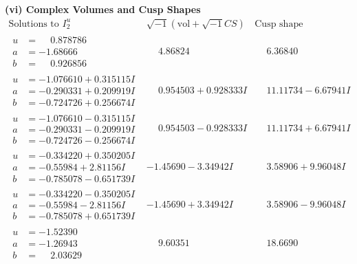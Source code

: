 \documentclass[1p]{elsarticle_modified}
\theoremstyle{definition}
\newcommand{\I}{\sqrt{-1}}
\begin{document}
\newpage\flushleft \textbf{(vi) Complex Volumes and Cusp Shapes}
$$\begin{array}{c|c|c}  
\text{Solutions to }I^u_{2}& \I (\text{vol} + \sqrt{-1}CS) & \text{Cusp shape}\\
 \hline 
\begin{aligned}
u &= \phantom{-}0.878786\phantom{ +0.000000I} \\
a &= -1.68666\phantom{ +0.000000I} \\
b &= \phantom{-}0.926856\phantom{ +0.000000I}\end{aligned}
 & \phantom{-}4.86824\phantom{ +0.000000I} & \phantom{-}6.36840\phantom{ +0.000000I} \\ \hline\begin{aligned}
u &= -1.076610 + 0.315115 I \\
a &= -0.290331 + 0.209919 I \\
b &= -0.724726 + 0.256674 I\end{aligned}
 & \phantom{-}0.954503 + 0.928333 I & \phantom{-}11.11734 - 6.67941 I \\ \hline\begin{aligned}
u &= -1.076610 - 0.315115 I \\
a &= -0.290331 - 0.209919 I \\
b &= -0.724726 - 0.256674 I\end{aligned}
 & \phantom{-}0.954503 - 0.928333 I & \phantom{-}11.11734 + 6.67941 I \\ \hline\begin{aligned}
u &= -0.334220 + 0.350205 I \\
a &= -0.55984 + 2.81156 I \\
b &= -0.785078 - 0.651739 I\end{aligned}
 & -1.45690 - 3.34942 I & \phantom{-}3.58906 + 9.96048 I \\ \hline\begin{aligned}
u &= -0.334220 - 0.350205 I \\
a &= -0.55984 - 2.81156 I \\
b &= -0.785078 + 0.651739 I\end{aligned}
 & -1.45690 + 3.34942 I & \phantom{-}3.58906 - 9.96048 I \\ \hline\begin{aligned}
u &= -1.52390\phantom{ +0.000000I} \\
a &= -1.26943\phantom{ +0.000000I} \\
b &= \phantom{-}2.03629\phantom{ +0.000000I}\end{aligned}
 & \phantom{-}9.60351\phantom{ +0.000000I} & \phantom{-}18.6690\phantom{ +0.000000I} \\ \hline\begin{aligned}

\end{aligned}
\end{array}$$
\end{document}
